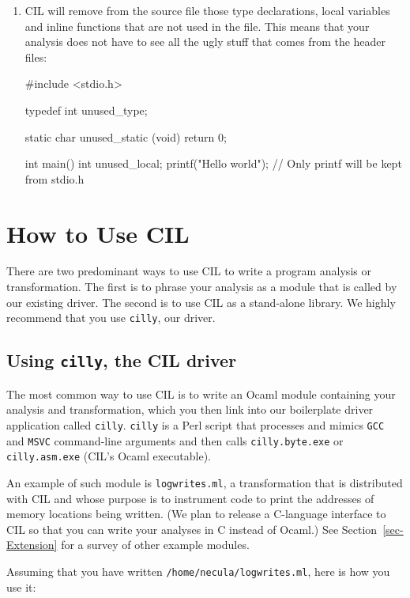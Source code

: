 \documentclass[letterpaper]{article}
\def\secref#1{Section~\ref{sec-#1}}
\def\t#1{{\tt #1}}
\begin{document}
\begin{enumerate}
\item CIL will remove from the source file those type declarations, local
variables and inline functions that are not used in the file. This means that
your analysis does not have to see all the ugly stuff that comes from the
header files: 
\begin{cilcode}[global]
#include <stdio.h>

typedef int unused_type;

static char unused_static (void) { return 0; }

int main() {
  int unused_local;
  printf("Hello world\n"); // Only printf will be kept from stdio.h     
}
\end{cilcode}

\end{enumerate}

\section{How to Use CIL}\label{sec-cil}

There are two predominant ways to use CIL to write a program analysis or
transformation. The first is to phrase your analysis as a module that is
called by our existing driver. The second is to use CIL as a stand-alone
library. We highly recommend that you use \t{cilly}, our driver. 

\subsection{Using \t{cilly}, the CIL driver}

The most common way to use CIL is to write an Ocaml module containing your
analysis and transformation, which you then link into our boilerplate
driver application called \t{cilly}. \t{cilly} is a Perl script that
processes and mimics \t{GCC} and \t{MSVC} command-line arguments and then
calls \t{cilly.byte.exe} or \t{cilly.asm.exe} (CIL's Ocaml executable). 

An example of such module is \t{logwrites.ml}, a transformation that is
distributed with CIL and whose purpose is to instrument code to print the
addresses of memory locations being written. (We plan to release a
C-language interface to CIL so that you can write your analyses in C
instead of Ocaml.) See \secref{Extension} for a survey of other example
modules. 

Assuming that you have written \t{/home/necula/logwrites.ml}, 
here is how you use it: 
\end{document}
